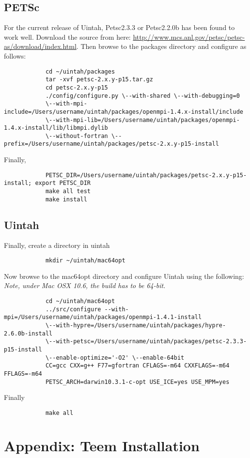 \documentclass[11pt,fleqn]{book} %
\begin{document}
		\section{PETSc}
		For the current release of Uintah, Petsc2.3.3 or Petsc2.2.0b has been found to work well. Download the source from here: \url{http://www.mcs.anl.gov/petsc/petsc-as/download/index.html}.
		Then browse to the packages directory and configure as follows:
		{\small
		\begin{lstlisting}
			cd ~/uintah/packages
			tar -xvf petsc-2.x.y-p15.tar.gz
			cd petsc-2.x.y-p15
			./config/configure.py \--with-shared \--with-debugging=0 
			\--with-mpi-include=/Users/username/uintah/packages/openmpi-1.4.x-install/include 
			\--with-mpi-lib=/Users/username/uintah/packages/openmpi-1.4.x-install/lib/libmpi.dylib 
			\--without-fortran \--prefix=/Users/username/uintah/packages/petsc-2.x.y-p15-install
		\end{lstlisting}}
		Finally,
		{\small
		\begin{lstlisting}
			PETSC_DIR=/Users/username/uintah/packages/petsc-2.x.y-p15-install; export PETSC_DIR
			make all test
			make install
		\end{lstlisting}}
		
		\section{Uintah}
		Finally, create a directory in uintah
		{\small 
		\begin{lstlisting}
			mkdir ~/uintah/mac64opt
		\end{lstlisting}} %
		\noindent Now browse to the mac64opt directory and configure Uintah using the following:
		\emph{Note, under Mac OSX 10.6, the build has to be 64-bit.}
		{\small
		\begin{lstlisting}
			cd ~/uintah/mac64opt
			../src/configure --with-mpi=/Users/username/uintah/packages/openmpi-1.4.1-install 
			\--with-hypre=/Users/username/uintah/packages/hypre-2.6.0b-install 
			\--with-petsc=/Users/username/uintah/packages/petsc-2.3.3-p15-install 
			\--enable-optimize='-O2' \--enable-64bit 
			CC=gcc CXX=g++ F77=gfortran CFLAGS=-m64 CXXFLAGS=-m64 FFLAGS=-m64
			PETSC_ARCH=darwin10.3.1-c-opt USE_ICE=yes USE_MPM=yes
		\end{lstlisting}} %
		\noindent Finally
		{\small
		\begin{lstlisting}
			make all
		\end{lstlisting}}
\chapter{Appendix: Teem Installation}
\end{document}
